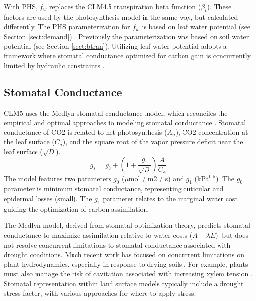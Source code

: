 \documentclass[draft,linenumbers]{agujournal}
\begin{document}
    With PHS, $f_w$ replaces the CLM4.5 transpiration beta function ($\beta_t$). 
    These factors are used by the photosynthesis model in the same way, but calculated differently. 
    The PHS parameterization for $f_w$ is based on leaf water potential (see Section \ref{sect:demand}) . 
    Previously the parameterization was based on soil water potential (see Section \ref{sect:btran}).
    Utilizing leaf water potential adopts a framework where stomatal conductance optimized for carbon gain is concurrently limited by hydraulic constraints \citep{novick2016a}.


\subsection{Stomatal Conductance}
\label{sect:gs}
    CLM5 uses the Medlyn stomatal conductance model, which reconciles the empirical and optimal approaches to modeling 
    stomatal conductance \citep{medlyn2011}. 
    Stomatal conductance of CO2 is related to net photosynthesis ($A_n$), CO2 concentration at the leaf surface 
    ($C_a$), and the square root of the vapor pressure deficit near the leaf surface ($\sqrt{D}$).
    \begin{equation}
    g_s=g_0+\left(1+\dfrac{g_1}{\sqrt{D}}\right)\dfrac{A}{C_a}
    \end{equation}
    The model features two parameters $g_0$ ($\mu$mol / m2 / s) and $g_1$ (kPa$^{0.5}$). 
    The $g_0$ parameter is minimum stomatal conductance, representing cuticular and epidermal losses (small). 
    The $g_1$ parameter relates to the marginal water cost guiding the optimization of carbon assimilation.
    
    The Medlyn model, derived from stomatal optimization theory, predicts stomatal conductance to maximize assimilation relative to water costs ($A-\lambda E$), 
    but does not resolve concurrent limitations to stomatal conductance associated with drought conditions.
    Much recent work has focused on concurrent limitations on plant hydrodynamics, especially in response to drying soils \citep{manzoni2013b,novick2016a,zhou2014}.
    For example, plants must also manage the risk of cavitation associated with increasing xylem tension \citep{sperry1998}.
    Stomatal representation within land surface models typically include a drought stress factor, with various approaches for where to apply stress.
    
\end{document}
